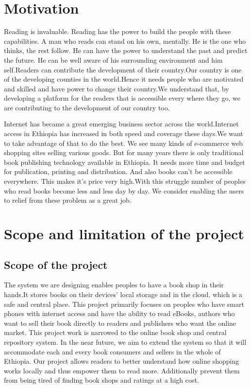 \section{Motivation}
Reading is invaluable. Reading has the power to build the people with these capabilities. A man who reads can stand on his own, mentally. He is the one who thinks, the rest follow. He can have the power to understand the past and predict the future. He can be well aware of his surrounding environment and him self.Readers can contribute the development of their country.Our country is one of the developing counties in the world.Hence it needs people who are motivated and skilled and have power to change their country.We understand that, by developing a platform for the readers that is accessible every where they go, we are contributing to the development of our country too.

Internet has became a great emerging business sector across the world.Internet access in Ethiopia has increased in both speed and coverage these days.We want to take advantage of that to do the best. We see many kinds of e-commerce web shopping sites selling various goods. But for many years there is only traditional book publishing technology available in Ethiopia. It needs more time and budget for publication, printing and distribution. And also books can't be accessible everywhere. This makes it's price very high.With this struggle number of peoples who read books become less and less day by day. We consider enabling the users to relief from these problem as a great job.


	\section{Scope and limitation of the project}
		\subsection{Scope of the project}

The system we are designing enables peoples to have a book shop in their hands.It stores books on their devices' local storage and in the cloud, which is a safe and central place. This project primarily focuses on peoples who have smart phones with internet access and have the ability to read eBooks, authors who want to sell their book directly to readers and publishers who want the online market. This project work is narrowed to the online book shop and central repository system. In the near future, we aim to extend the system so that it will accommodate each and every book consumers and sellers in the whole of Ethiopia. Our project allows readers to better understand how online shopping works locally and thus empower them to read more. Additionally prevent them from being tired of finding book shops and ratings at a high cost.

